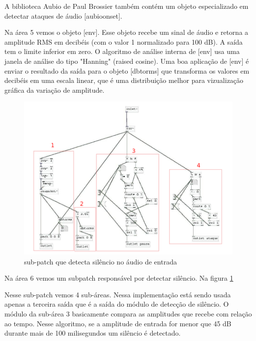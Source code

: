 \documentclass{ppgmus}
\begin{document}
A biblioteca Aubio de Paul Brossier também contém um objeto
especializado em detectar ataques de áudio [aubioonset\texttildelow].



Na área 5 vemos o objeto [env\texttildelow]. Esse objeto recebe um sinal de áudio
e retorna a amplitude RMS em decibéis (com o valor 1 normalizado para 100 dB).
A saída tem o limite inferior em zero. O algoritmo de análise interna de [env\texttildelow]
usa uma janela de análise do tipo "Hanning" (raised cosine). Uma boa aplicação de 
[env\texttildelow] é enviar o resultado da saída para o objeto [dbtorms] que transforma
os valores em decibéis em uma escala linear, que é uma distribuição melhor para vizualização
gráfica da variação de amplitude.






\begin{figure}
\includegraphics[scale=.5]{sinc-audioanalise-detecta}
\caption{sub-patch que detecta silêncio no áudio de entrada}
\label{[sinc-audioanalise-detecta]}
\end{figure}




Na área 6 vemos um subpatch responsável por detectar
silêncio. Na figura \ref{[sinc-audioanalise-detecta]}


Nesse sub-patch vemos 4 sub-áreas. Nessa implementação
está sendo usada apenas a terceira saída que é a saída do
módulo de detecção de silêncio. O módulo da sub-área 3
basicamente compara as amplitudes que recebe com relação ao tempo.
Nesse algoritmo, se a amplitude de entrada for menor que 45 dB durante
mais de 100 milisegundos um silêncio é detectado.
\end{document}
